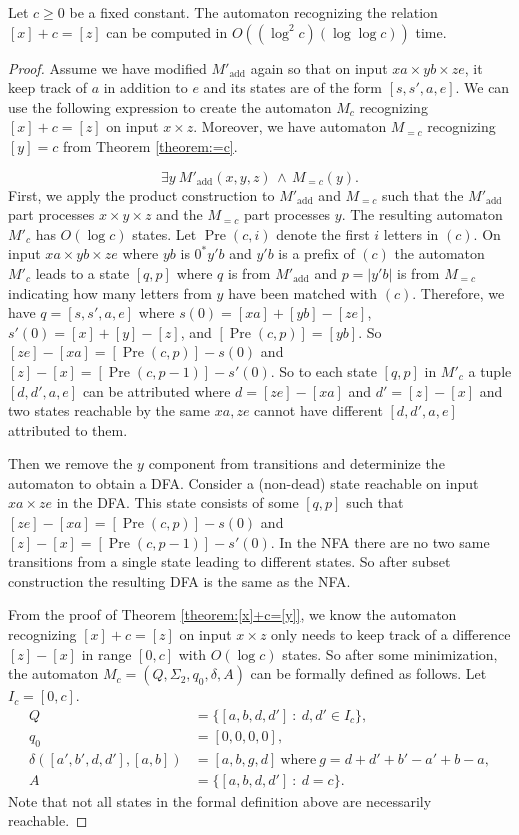 \documentclass[12pt,reqno]{article}
\def\AND{\, \wedge \, }
\def\suchthat{\ : \ }
\DeclareMathOperator{\pre}{Pre}
\DeclareMathOperator{\add}{add}
\begin{document}
\begin{theorem} \label{theorem:[x]+c=[z]-time}
    Let $c \geq 0$ be a fixed constant. The automaton recognizing the relation $[x] + c =[z]$ can be computed in $O((\log^2 c)(\log \log c))$ time.
\end{theorem}
\begin{proof}
Assume we have modified $M'_{\add}$ again so that on input $xa \times yb \times ze$, it keep track of $a$ in addition to $e$ and its states are of the form $[s, s', a, e]$.  We can use the following expression to create the automaton $M_c$ recognizing $[x] + c=[z]$ on input $x \times z$. Moreover, we have automaton $M_{=c}$ recognizing $[y]=c$ from Theorem \ref{theorem:=c}.

    \[
    \exists y \ M'_{\add}(x, y, z) \AND M_{=c}(y).
    \]
    First, we apply the product construction to $M'_{\add}$ and $M_{=c}$ such that the $M'_{\add}$ part processes $x\times y \times z$ and the $M_{=c}$ part processes $y$. The resulting automaton $M'_c$ has $O(\log c)$ states.
     Let $\pre(c, i)$ denote the first $i$ letters in $(c)$. On input $xa\times yb \times ze$ where $yb$ is $0^*y'b$ and $y'b$ is a prefix of $(c)$ the automaton $M'_c$ leads to a state $[q, p]$ where $q$ is from $M'_{\add}$ and $p=|y'b|$ is from $M_{=c}$ indicating how many letters from $y$ have been matched with $(c)$. Therefore, we have $q=[s, s', a, e]$ where $s(0)=[xa] + [yb] - [ze]$, $s'(0)=[x]+[y]-[z]$, and $[\pre(c, p)] = [yb]$. So $[ze] - [xa] = [\pre(c, p)] - s(0)$ and $[z]-[x]=[\pre(c, p-1)]-s'(0)$.  So to each state $[q, p]$ in $M'_c$ a tuple $[d, d', a, e]$ can be attributed where $d = [ze]-[xa]$ and $d'= [z]-[x]$ and two states reachable by the same $xa, ze$ cannot have different $[d, d', a, e]$ attributed to them.

    
    Then we remove the $y$ component from transitions and determinize the automaton to obtain a DFA. Consider a (non-dead) state reachable on input $xa \times ze$ in the DFA. This state consists of some $[q, p]$ such that $[ze] - [xa] = [\pre(c, p)] - s(0)$ and $[z]-[x]=[\pre(c, p-1)]-s'(0)$. In the NFA there are no two same transitions from a single state leading to different states. So after subset construction the resulting DFA is the same as the NFA.

From the proof of Theorem \ref{theorem:[x]+c=[y]}, we know the automaton recognizing $[x]+c= [z]$ on input $x \times z$ only needs to keep track of a difference $[z] - [x]$ in range $[0, c]$ with $O(\log c)$ states. So after some minimization, the automaton $M_c=(Q, \Sigma_2, q_0, \delta, A)$ can be formally defined as follows.  Let $I_c = [0, c]$. 
 \begin{align*}
     Q &= \{[a, b, d, d'] \suchthat d, d' \in I_c\}, \\
     q_0 &= [0, 0, 0, 0], \\
     \delta([a', b', d, d'], [a, b]) &= [a, b, g, d] \ \text{where} \ g= d + d' +b' - a' + b - a, \\
     A &= \{[a, b, d, d'] \suchthat d = c\}.
 \end{align*}
 Note that not all states in the formal definition above are necessarily reachable.


\end{proof}
\end{document}
